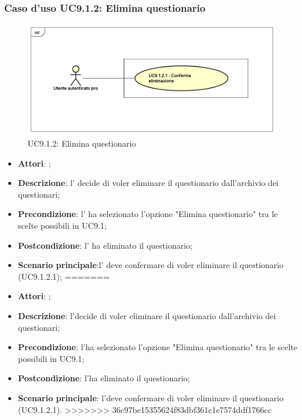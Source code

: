 			\subsubsection{Caso d'uso UC9.1.2: Elimina questionario}
			\label{UC9.1.2}
			\begin{figure}[h]
				\centering
			\includegraphics[scale=0.5,keepaspectratio]{UML/UC9_1_2.png}
				\caption{UC9.1.2: Elimina questionario}
			\end{figure}
			\FloatBarrier
			\begin{itemize}
<<<<<<< HEAD
				\item \textbf{Attori}: \uaupro{};
				\item \textbf{Descrizione}: l'\uaupro{} decide di voler eliminare il questionario dall'archivio dei questionari;
				\item \textbf{Precondizione}: l'\uaupro{} ha selezionato l'opzione "Elimina questionario" tra le scelte possibili in UC9.1;
				\item \textbf{Postcondizione}: l'\uaupro{} ha eliminato il questionario;
				\item \textbf{Scenario principale}:l'\uaupro{} deve confermare di voler eliminare il questionario (UC9.1.2.1);
=======
				\item \textbf{Attori}: \uaupro;
				\item \textbf{Descrizione}: l'\uaupro decide di voler eliminare il questionario dall'archivio dei questionari;
				\item \textbf{Precondizione}: l'\uaupro ha selezionato l'opzione "Elimina questionario" tra le scelte possibili in UC9.1;
				\item \textbf{Postcondizione}: l'\uaupro ha eliminato il questionario;
				\item \textbf{Scenario principale}: l'\uaupro deve confermare di voler eliminare il questionario (UC9.1.2.1).
>>>>>>> 36c97be15355624f83dbf361c1e7574ddf1766cc
			\end{itemize}
			
